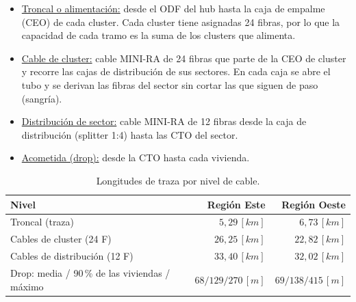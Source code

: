 \begin{itemize}
    \item \underline{Troncal o alimentación:} desde el ODF del hub hasta la caja de empalme (CEO) de cada cluster. Cada cluster tiene asignadas 24 fibras, por lo que la capacidad de cada tramo es la suma de los clusters que alimenta.
    \item \underline{Cable de cluster:} cable MINI-RA de 24 fibras que parte de la CEO de cluster y recorre las cajas de distribución de sus sectores. En cada caja se abre el tubo y se derivan las fibras del sector sin cortar las que siguen de paso (sangría).
    \item \underline{Distribución de sector:} cable MINI-RA de 12 fibras desde la caja de distribución (splitter 1:4) hasta las CTO del sector.
    \item \underline{Acometida (drop):} desde la CTO hasta cada vivienda.
\end{itemize}

\begin{table}[H]
    \centering
    \footnotesize
    \caption{Longitudes de traza por nivel de cable.}
    \label{tab:longitudes}
    \begin{tabular}{|l|r|r|}
        \hline
        \textbf{Nivel} & \textbf{Región Este} & \textbf{Región Oeste} \\
        \hline
        Troncal (traza) & $5{,}29 \, [km]$ & $6{,}73 \, [km]$ \\
        Cables de cluster (24 F) & $26{,}25 \, [km]$ & $22{,}82 \, [km]$ \\
        Cables de distribución (12 F) & $33{,}40 \, [km]$ & $32{,}02 \, [km]$ \\
        Drop: media / 90\,\% de las viviendas / máximo & $68 / 129 / 270 \, [m]$ & $69 / 138 / 415 \, [m]$ \\
        \hline
    \end{tabular}
\end{table}

